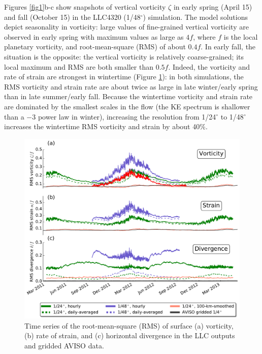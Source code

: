 \documentclass[grl]{agutex2015}
\begin{document}
\begin{article}
Figures \ref{fig1}b-c show snapshots of vertical vorticity $\zeta$ in early spring
(April 15) and fall (October 15) in the LLC4320 (1/48$^\circ$) simulation.
The model solutions depict seasonality in vorticity: large values of
fine-grained vertical vorticity are observed in early spring with maximum
values as large as $4f$, where $f$ is
the local planetary vorticity, and root-mean-square (RMS) of about $0.4f$. In early
fall, the situation is the opposite: the vertical vorticity is relatively coarse-grained;
its local maximum and RMS are both smaller than $0.5f$.
Indeed, the vorticity and rate of strain are strongest in wintertime (Figure \ref{fig2}):
in both simulations, the RMS vorticity and strain rate are about twice as large in
late winter/early spring
than in late summer/early fall. Because the wintertime vorticity and strain rate
are dominated by the smallest scales in the flow (the KE spectrum is shallower than
a $-3$ power law in winter), increasing the resolution from
1/24$^\circ$ to 1/48$^\circ$ increases the wintertime RMS vorticity
and strain by about 40$\%$.

 \begin{figure}[ht]
   \begin{center}
     \includegraphics[width=.65\textwidth]{figs/fig2.pdf}
  \caption{\small Time series of the root-mean-square (RMS) of surface (a) vorticity,
  (b) rate of strain, and (c) horizontal divergence in the LLC outputs and gridded AVISO data.}
  \label{fig2}
  \end{center}
\end{figure}


\end{article}
\end{document}

